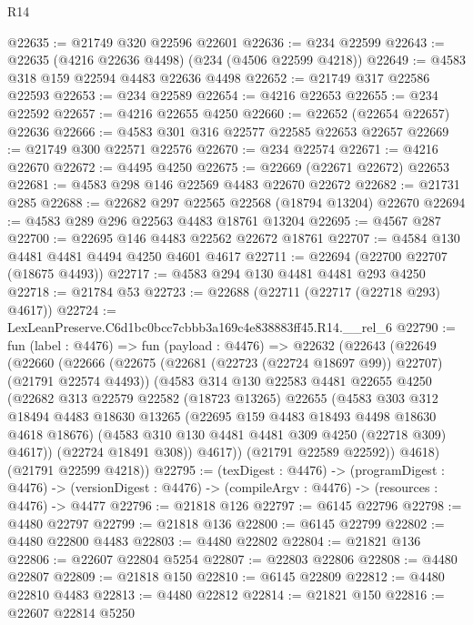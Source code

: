 \begin{lexlean}{R14}
\begin{coremodule}
@22635 := @21749 @320 @22596 @22601
@22636 := @234 @22599
@22643 := @22635 (@4216 @22636 @4498) (@234 (@4506 @22599 @4218))
@22649 := @4583 @318 @159 @22594 @4483 @22636 @4498
@22652 := @21749 @317 @22586 @22593
@22653 := @234 @22589
@22654 := @4216 @22653
@22655 := @234 @22592
@22657 := @4216 @22655 @4250
@22660 := @22652 (@22654 @22657) @22636
@22666 := @4583 @301 @316 @22577 @22585 @22653 @22657
@22669 := @21749 @300 @22571 @22576
@22670 := @234 @22574
@22671 := @4216 @22670
@22672 := @4495 @4250
@22675 := @22669 (@22671 @22672) @22653
@22681 := @4583 @298 @146 @22569 @4483 @22670 @22672
@22682 := @21731 @285
@22688 := @22682 @297 @22565 @22568 (@18794 @13204) @22670
@22694 := @4583 @289 @296 @22563 @4483 @18761 @13204
@22695 := @4567 @287
@22700 := @22695 @146 @4483 @22562 @22672 @18761
@22707 := @4584 @130 @4481 @4481 @4494 @4250 @4601 @4617
@22711 := @22694 (@22700 @22707 (@18675 @4493))
@22717 := @4583 @294 @130 @4481 @4481 @293 @4250
@22718 := @21784 @53
@22723 := @22688 (@22711 (@22717 (@22718 @293) @4617))
@22724 := LexLeanPreserve.C6d1bc0bcc7cbbb3a169c4e838883ff45.R14.__rel_6
@22790 := fun (label : @4476) =>
  fun (payload : @4476) =>
  @22632
    (@22643
      (@22649
        (@22660
          (@22666
            (@22675 (@22681 (@22723 (@22724 @18697 @99)) @22707) (@21791 @22574 @4493))
            (@4583
              @314
              @130
              @22583
              @4481
              @22655
              @4250
              (@22682
                @313
                @22579
                @22582
                (@18723 @13265)
                @22655
                (@4583
                  @303
                  @312
                  @18494
                  @4483
                  @18630
                  @13265
                  (@22695 @159 @4483 @18493 @4498 @18630 @4618 @18676)
                  (@4583 @310 @130 @4481 @4481 @309 @4250 (@22718 @309) @4617))
                (@22724 @18491 @308))
              @4617))
          (@21791 @22589 @22592))
        @4618)
      (@21791 @22599 @4218))
@22795 := (texDigest : @4476) ->
  (programDigest : @4476) ->
  (versionDigest : @4476) -> (compileArgv : @4476) -> (resources : @4476) -> @4477
@22796 := @21818 @126
@22797 := @6145 @22796
@22798 := @4480 @22797
@22799 := @21818 @136
@22800 := @6145 @22799
@22802 := @4480 @22800 @4483
@22803 := @4480 @22802
@22804 := @21821 @136
@22806 := @22607 @22804 @5254
@22807 := @22803 @22806
@22808 := @4480 @22807
@22809 := @21818 @150
@22810 := @6145 @22809
@22812 := @4480 @22810 @4483
@22813 := @4480 @22812
@22814 := @21821 @150
@22816 := @22607 @22814 @5250

\end{coremodule}
\end{lexlean}
